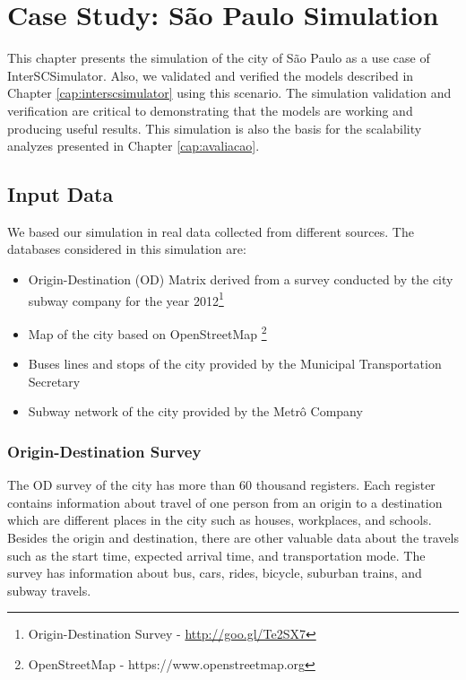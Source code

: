 \chapter{Case Study: S\~ao Paulo Simulation}
\label{cap:sao_paulo}

This chapter presents the simulation of the city of S\~ao Paulo as a use case of InterSCSimulator. Also, we validated and verified the models described in Chapter \ref{cap:interscsimulator} using this scenario. The simulation validation and verification are critical to demonstrating that the models are working and producing useful results. This simulation is also the basis for the scalability analyzes presented in Chapter \ref{cap:avaliacao}.

\section{Input Data}

We based our simulation in real data collected from different sources. The databases considered in this simulation are:

\begin{itemize}

\item Origin-Destination (OD) Matrix derived from a survey conducted by the city subway company for the year 2012\footnote{Origin-Destination Survey - \url{http://goo.gl/Te2SX7}}

\item Map of the city based on OpenStreetMap \footnote{OpenStreetMap - https://www.openstreetmap.org}

\item Buses lines and stops of the city provided by the Municipal Transportation Secretary

\item Subway network of the city provided by the Metr\^o Company

\end{itemize}

\subsection{Origin-Destination Survey}

The OD survey of the city has more than 60 thousand registers. Each register contains information about travel of one person from an origin to a destination which are different places in the city such as houses, workplaces, and schools. Besides the origin and destination, there are other valuable data about the travels such as the start time, expected arrival time, and transportation mode. The survey has information about bus, cars, rides, bicycle, suburban trains, and subway travels.

